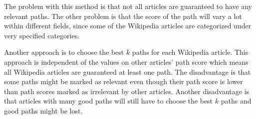 The problem with this method is that not all articles are guaranteed to have any relevant paths. The other problem is that the score of the path will vary a lot within different fields, since some of the Wikipedia articles are categorized under very specified categories. 


Another approach is to choose the best $k$ paths for each Wikipedia article. This approach is independent of the values on other articles' path score which means all Wikipedia articles are guaranteed at least one path. The disadvantage is that some paths might be marked as relevant even though their path score is lower than path scores marked as irrelevant by other articles. Another disadvantage is that articles with many good paths will still have to choose the best $k$ paths and good paths might be lost. 


